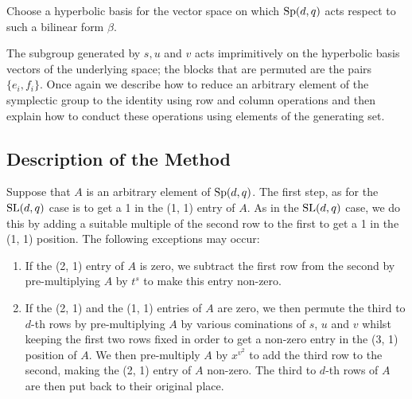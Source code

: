 \documentclass[12pt]{report}
\def\SL{{\rm SL}}
\def\Sp{{\rm Sp}}
\begin{document}
Choose a hyperbolic basis for the vector space on which $\Sp(d, q)$ acts respect to such a bilinear form $\beta$.

The subgroup generated by $s, u$ and $v$ acts imprimitively on the hyperbolic basis vectors of the underlying space; the blocks that are permuted are the pairs $\{e_i, f_i\}$. Once again we describe how to reduce an arbitrary element of the symplectic group to the identity using row and column operations and then explain how to conduct these operations using elements of the generating set.

\subsection{Description of the Method}

Suppose that $A$ is an arbitrary element of $\Sp(d, q)$. The first step, as for the $\SL(d, q)$ case is to get a 1 in the (1, 1) entry of $A$. As in the $\SL(d, q)$ case, we do this by adding a suitable multiple of the second row to the first to get a 1 in the (1, 1) position. The following exceptions may occur:

\begin{enumerate}
\item If the (2, 1) entry of $A$ is zero, we subtract the first row from the second by pre-multiplying $A$ by $t^s$ to make this entry non-zero.
\item If the (2, 1) and the (1, 1) entries of $A$ are zero, we then permute the third to $d$-th rows by pre-multiplying $A$ by various cominations of $s$, $u$ and $v$ whilst keeping the first two rows fixed in order to get a non-zero entry in the (3, 1) position of $A$. We then pre-multiply $A$ by $x^{v^2}$ to add the third row to the second, making the (2, 1) entry of $A$ non-zero. The third to $d$-th rows of $A$ are then put back to their original place.
\end{enumerate}
\end{document}
